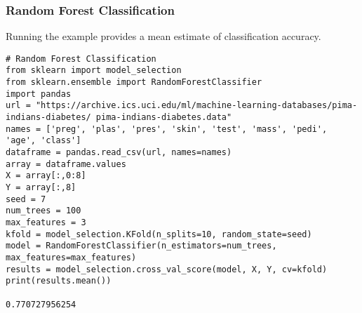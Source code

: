 \begin{frame}[fragile]\frametitle{Random Forest Classification}
Running the example provides a mean estimate of classification accuracy.

\begin{lstlisting}
# Random Forest Classification
from sklearn import model_selection
from sklearn.ensemble import RandomForestClassifier
import pandas
url = "https://archive.ics.uci.edu/ml/machine-learning-databases/pima-indians-diabetes/ pima-indians-diabetes.data"
names = ['preg', 'plas', 'pres', 'skin', 'test', 'mass', 'pedi', 'age', 'class']
dataframe = pandas.read_csv(url, names=names)
array = dataframe.values
X = array[:,0:8]
Y = array[:,8]
seed = 7
num_trees = 100
max_features = 3
kfold = model_selection.KFold(n_splits=10, random_state=seed)
model = RandomForestClassifier(n_estimators=num_trees, max_features=max_features)
results = model_selection.cross_val_score(model, X, Y, cv=kfold)
print(results.mean())

0.770727956254
\end{lstlisting}
\end{frame}








